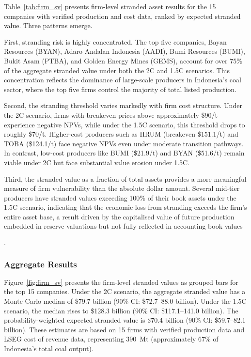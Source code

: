 Table~\ref{tab:firm_sv} presents firm-level stranded asset results for the 15 companies with verified production and cost data, ranked by expected stranded value. Three patterns emerge.

First, stranding risk is highly concentrated. The top five companies, Bayan Resources (BYAN), Adaro Andalan Indonesia (AADI), Bumi Resources (BUMI), Bukit Asam (PTBA), and Golden Energy Mines (GEMS), account for over 75\% of the aggregate stranded value under both the 2\textdegree C and 1.5\textdegree C scenarios. This concentration reflects the dominance of large-scale producers in Indonesia's coal sector, where the top five firms control the majority of total listed production.

Second, the stranding threshold varies markedly with firm cost structure. Under the 2\textdegree C scenario, firms with breakeven prices above approximately \$90/t experience negative NPVs, while under the 1.5\textdegree C scenario, this threshold drops to roughly \$70/t. Higher-cost producers such as HRUM (breakeven \$151.1/t) and TOBA (\$124.1/t) face negative NPVs even under moderate transition pathways. In contrast, low-cost producers like BUMI (\$21.9/t) and BYAN (\$51.6/t) remain viable under 2\textdegree C but face substantial value erosion under 1.5\textdegree C.

Third, the stranded value as a fraction of total assets provides a more meaningful measure of firm vulnerability than the absolute dollar amount. Several mid-tier producers have stranded values exceeding 100\% of their book assets under the 1.5\textdegree C scenario, indicating that the economic loss from stranding exceeds the firm's entire asset base, a result driven by the capitalised value of future production embedded in reserve valuations but not fully reflected in accounting book values

\begin{landscape}

\end{landscape}

.

\subsubsection{Aggregate Results}

Figure~\ref{fig:firm_sv} presents the firm-level stranded values as grouped bars for the top 15 companies. Under the 2\textdegree C scenario, the aggregate stranded value has a Monte Carlo median of \$79.7 billion (90\% CI: \$72.7--88.0 billion). Under the 1.5\textdegree C scenario, the median rises to \$128.3 billion (90\% CI: \$117.1--141.0 billion). The probability-weighted expected stranded value is \$70.4 billion (90\% CI: \$59.7--82.1 billion). These estimates are based on 15 firms with verified production data and LSEG cost of revenue data, representing 390~Mt (approximately 67\% of Indonesia's total coal output).


